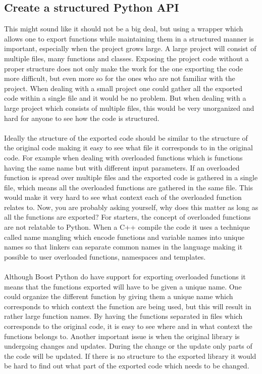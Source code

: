 \newpage

\subsection{Create a structured Python API}
This might sound like it should not be a big deal, but using a wrapper which allows one to export functions while maintaining them in a structured manner is important, especially when the project grows large. A large project will consist of multiple files, many functions and classes. Exposing the project code without a proper structure does not only make the work for the one exporting the code more difficult, but even more so for the ones who are not familiar with the project. When dealing with a small project one could gather all the exported code within a single file and it would be no problem. But when dealing with a large project which consists of multiple files, this would be very unorganized and hard for anyone to see how the code is structured. \\\\
Ideally the structure of the exported code should be similar to the structure of the original code making it easy to see what file it corresponds to in the original code. For example when dealing with overloaded functions which is functions having the same name but with different input parameters. If an overloaded function is spread over multiple files and the exported code is gathered in a single file, which means all the overloaded functions are gathered in the same file. This would make it very hard to see what context each of the overloaded function relates to. Now, you are probably asking yourself, why does this matter as long as all the functions are exported? For starters, the concept of overloaded functions are not relatable to Python. When a C++ compile the code it uses a technique called name mangling which encode functions and variable names into unique names so that linkers can separate common names in the language making it possible to user overloaded functions, namespaces and templates. \\\\
Although Boost Python do have support for exporting overloaded functions it means that the functions exported will have to be given a unique name. One could organize the different function by giving them a unique name which corresponds to which context the function are being used, but this will result in rather large function names. By having the functions separated in files which corresponds to the original code, it is easy to see where and in what context the functions belongs to. Another important issue is when the original library is undergoing changes and updates. During the change or the update only parts of the code will be updated. If there is no structure to the exported library it would be hard to find out what part of the exported code which needs to be changed.

